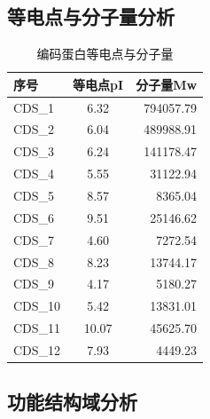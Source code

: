 \documentclass[supercite]{HustGraduPaper}
\begin{document}
	\subsection{等电点与分子量分析}
	\begin{table}[H]
  \begin{center}
    \begin{tabular}{|l|c|r|} %
			\hline
      \textbf{序号} & \textbf{等电点pI} & \textbf{分子量Mw}\\
      \hline
			  CDS\_1 & 6.32 & 794057.79\\
        CDS\_2 & 6.04 & 489988.91\\
        CDS\_3 & 6.24 & 141178.47\\
        CDS\_4 & 5.55 & 31122.94\\
        CDS\_5 & 8.57 & 8365.04\\
        CDS\_6 & 9.51 & 25146.62\\
        CDS\_7 & 4.60 & 7272.54\\
  	    CDS\_8 & 8.23 & 13744.17\\
  	    CDS\_9 & 4.17 & 5180.27\\
  	    CDS\_10 & 5.42 & 13831.01\\
  	    CDS\_11 & 10.07 & 45625.70\\
  	    CDS\_12 & 7.93 & 4449.23\\ \hline
    \end{tabular}
		    \caption{编码蛋白等电点与分子量}
  \end{center}
\end{table}

	\subsection{功能结构域分析}
\end{document}
